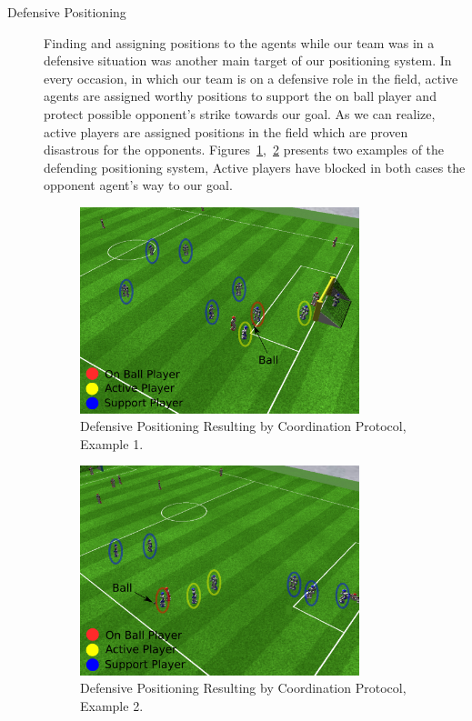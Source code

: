 \begin{description}
\item[Defensive Positioning]
Finding and assigning positions to the agents while our team was in a defensive situation was another main target of our positioning system. In every occasion, in which our team is on a defensive role in the field, active agents are assigned worthy positions to support the on ball player and protect possible opponent's strike towards our goal. As we can realize, active players are assigned positions in the field which are proven disastrous for the opponents. Figures~\ref{fig:DefendingPositioning},~\ref{fig:DefendingPositioning1} presents two examples of the defending positioning system, Active players have blocked in both cases the opponent agent's way to our goal.


\begin{figure}[t!]
\centering
  \includegraphics[width=0.8\textwidth]{Chapter5/figures/1.pdf}
  \caption{Defensive Positioning Resulting by Coordination Protocol, Example 1.} 
  \label{fig:DefendingPositioning}
\end{figure}


\begin{figure}[t!]
\centering
  \includegraphics[width=0.8\textwidth]{Chapter5/figures/2.pdf}
  \caption{Defensive Positioning Resulting by Coordination Protocol, Example 2.} 
  \label{fig:DefendingPositioning1}
\end{figure}


\end{description}
